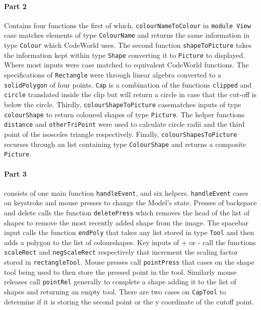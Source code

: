 \documentclass[11pt]{article}
\begin{document}
\paragraph{Part 2} Contains four functions the first of which, \verb|colourNameToColour| in \verb|module View|  case matches elements of  type \verb|ColourName| and returns the same information in type  \verb|Colour| which CodeWorld uses. The second function \verb|shapeToPicture| takes the information kept within type \verb|Shape| converting it to \verb|Picture| to displayed. Where most inputs were case matched to equivalent CodeWorld functions. The specifications of \verb|Rectangle| were through linear algebra converted to a \verb|solidPolygon| of four points.  \verb|Cap| is a combination of the functions \verb|clipped| and \verb|circle| translated inside the clip but will return a circle in case that the cut-off is below the circle. Thirdly, \verb|colourShapeToPicture| casematches inputs of type \verb|colourShape| to return coloured shapes of type \verb|Picture|. The helper functions \verb|distance| and \verb|otherTriPoint| were used to calculate circle radii and the third point of the isosceles triangle respectively. Finally, \verb|colourShapesToPicture| recurses through an list containing type \verb|ColourShape| and returns a composite \verb|Picture|.

\paragraph{Part 3} consists of one main function  \verb|handleEvent|, and six helpers. \verb|handleEvent| cases on keystroke and mouse presses to change the Model's state. Presses of backspace and delete calls the function \verb|deletePress| which removes the head of the list of shapes to remove the most recently added shape from the image. The spacebar input calls the function \verb|endPoly| that takes any list stored in type \verb|Tool| and then adds a polygon to the list of colourshapes. Key inputs of + or - call the functions \verb|scaleRect| and \verb|negScaleRect| respectively that increment the scaling factor stored in \verb|rectangleTool|. Mouse presses call \verb|pointPress| that cases on the shape tool being used to then store the pressed point in the tool. Similarly mouse releases call \verb|pointRel| generally to complete a shape adding it to the list of shapes and returning an empty tool. There are two cases on \verb|CapTool| to determine if it is storing the second point or the y coordinate of the cutoff point.
\end{document}
